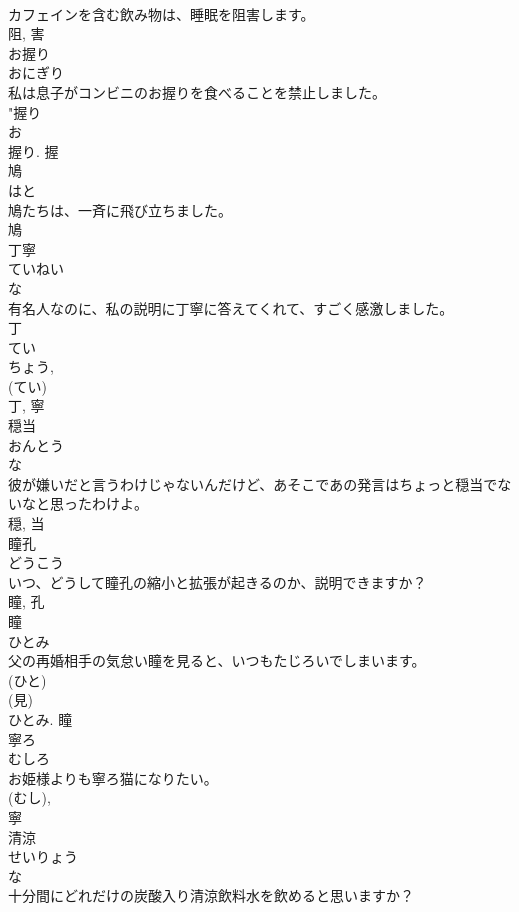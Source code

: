 \documentclass[8pt]{extreport}
\begin{document}
\begin{CJK}{UTF8}{min}
\\	カフェインを含む飲み物は、睡眠を阻害します。	
\\	阻, 害	
\\	お握り	
\\	おにぎり	
\\	私は息子がコンビニのお握りを食べることを禁止しました。	
\\	"握り 
\\	お 
\\	握り.	握	
\\	鳩	
\\	はと	
\\	鳩たちは、一斉に飛び立ちました。	
\\	鳩	
\\	丁寧	
\\	ていねい	
\\	な 
\\	有名人なのに、私の説明に丁寧に答えてくれて、すごく感激しました。	
\\	丁 
\\	てい 
\\	ちょう, 
\\	(てい) 
\\	丁, 寧	
\\	穏当	
\\	おんとう	
\\	な 
\\	彼が嫌いだと言うわけじゃないんだけど、あそこであの発言はちょっと穏当でないなと思ったわけよ。	
\\	穏, 当	
\\	瞳孔	
\\	どうこう	
\\	いつ、どうして瞳孔の縮小と拡張が起きるのか、説明できますか？	
\\	瞳, 孔	
\\	瞳	
\\	ひとみ	
\\	父の再婚相手の気怠い瞳を見ると、いつもたじろいでしまいます。	
\\	(ひと) 
\\	(見) 
\\	ひとみ.	瞳	
\\	寧ろ	
\\	むしろ	
\\	お姫様よりも寧ろ猫になりたい。	
\\	(むし), 
\\	寧	
\\	清涼	
\\	せいりょう	
\\	な 
\\	十分間にどれだけの炭酸入り清涼飲料水を飲めると思いますか？	

\end{CJK}
\end{document}

